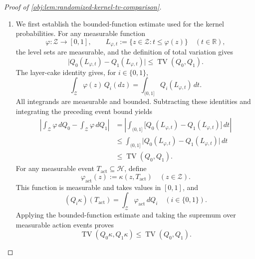 \documentclass[11pt]{article}
\begin{document}
\begin{proof}[Proof of \cref{obj:lem:randomized-kernel-tv-comparison}]
\begin{enumerate}
\item We first establish the bounded-function estimate used for the kernel probabilities. For any measurable function
\[
\varphi:\mathcal Z\longrightarrow[0,1],
\qquad
L_{\varphi,t}:=\{z\in\mathcal Z:t\le\varphi(z)\}
\quad(t\in\mathbb R),
\]
the level sets are measurable, and the definition of total variation gives
\[
\bigl|Q_0(L_{\varphi,t})-Q_1(L_{\varphi,t})\bigr|
\le \operatorname{TV}(Q_0,Q_1).
\]
The layer-cake identity gives, for \(i\in\{0,1\}\),
\[
\int_{\mathcal Z}\varphi(z)\,Q_i(dz)
=
\int_{(0,1]}Q_i(L_{\varphi,t})\,dt.
\]
All integrands are measurable and bounded. Subtracting these identities and integrating the preceding event bound yields
\[
\begin{aligned}
\left|
\int_{\mathcal Z}\varphi\,dQ_0-
\int_{\mathcal Z}\varphi\,dQ_1
\right|
&=
\left|\int_{(0,1]}
\bigl[Q_0(L_{\varphi,t})-Q_1(L_{\varphi,t})\bigr]\,dt\right|\\
&\le
\int_{(0,1]}
\bigl|Q_0(L_{\varphi,t})-Q_1(L_{\varphi,t})\bigr|\,dt\\
&\le \operatorname{TV}(Q_0,Q_1).
\end{aligned}
\]
For any measurable event \(T_{\mathrm{act}}\subseteq\mathcal H\), define
\[
\varphi_{\mathrm{act}}(z):=\kappa(z,T_{\mathrm{act}})
\quad(z\in\mathcal Z).
\]
This function is measurable and takes values in \([0,1]\), and
\[
(Q_i\kappa)(T_{\mathrm{act}})
=
\int_{\mathcal Z}\varphi_{\mathrm{act}}\,dQ_i
\quad(i\in\{0,1\}).
\]
Applying the bounded-function estimate and taking the supremum over measurable action events proves
\[
\operatorname{TV}(Q_0\kappa,Q_1\kappa)
\le \operatorname{TV}(Q_0,Q_1).
\]


\end{enumerate}
\end{proof}
\end{document}
